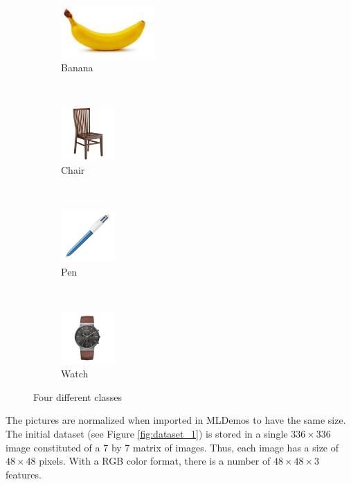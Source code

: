 \documentclass[a4paper,10pt]{article}
\begin{document}
\begin{figure}[H]
\centering
    \begin{subfigure}[t]{0.2\textwidth}
        \centering
        \includegraphics[height=2cm]{pictures/banana} 
        \caption{Banana}
        \label{fig:banana}
    \end{subfigure}%
    ~
    \begin{subfigure}[t]{0.2\textwidth}
        \centering
        \includegraphics[height=2cm]{pictures/chair2} 
        \caption{Chair}
        \label{fig:chair}
    \end{subfigure} 
    ~
    \begin{subfigure}[t]{0.2\textwidth}
        \centering
        \includegraphics[height=2cm]{pictures/stylo4} 
        \caption{Pen}
        \label{fig:pen}
    \end{subfigure}
    ~
    \begin{subfigure}[t]{0.2\textwidth}
        \centering
        \includegraphics[height=2cm]{pictures/watch2} 
        \caption{Watch}
        \label{fig:watch}
    \end{subfigure}   
\caption{Four different classes}
\label{fig:class}
\end{figure}


The pictures are normalized when imported in MLDemos to have the same size. The initial dataset (see Figure \ref{fig:dataset_1}) is stored in a single $336 \times 336 $ image constituted of a 7 by 7 matrix of images. Thus, each image has a size of $48 \times 48$ pixels. With a RGB color format, there is a number of $48\times48\times3$ features.
\end{document}
